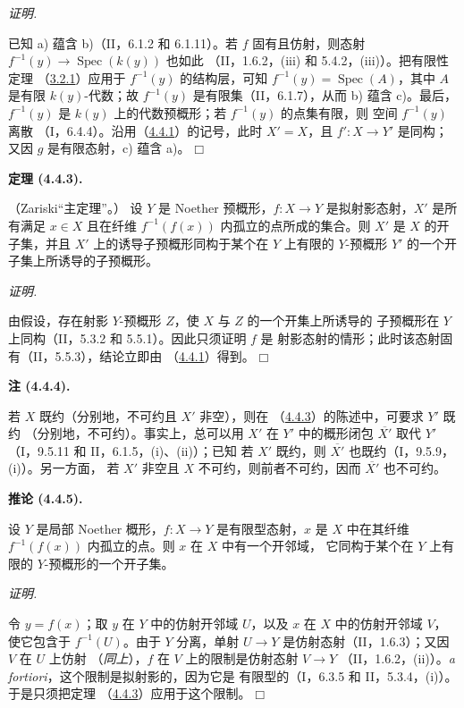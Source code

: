 \documentclass[UTF8,fontset=none,11pt,oneside,openany]{ctexbook}
\providecommand{\square}{\mdlgwhtsquare}
\newenvironment{theorem}[1][]{%
  \par\medskip\noindent\textbf{定理 (#1).}\ %
}{\par}
\newenvironment{corollary}[1][]{%
  \par\medskip\noindent\textbf{推论 (#1).}\ %
}{\par}
\newenvironment{remark}[1][]{%
  \par\medskip\noindent\textbf{注 (#1).}\ %
}{\par}
\newenvironment{proof}{%
  \par\smallskip\noindent\textit{证明.}\ %
}{\hfill$\square$\par}
\let\EGAOriginalLabel\label
\renewcommand{\label}[1]{\phantomsection\EGAOriginalLabel{#1}}
\begin{document}
\begin{proof}
已知 a) 蕴含 b)（II，6.1.2 和 6.1.11）。若 $f$ 固有且仿射，则态射
$f^{-1}(y)\to\operatorname{Spec}(k(y))$ 也如此
（II，1.6.2，(iii) 和 5.4.2，(iii)）。把有限性定理
（\hyperref[III.3.2.1-fr]{3.2.1}）应用于 $f^{-1}(y)$ 的结构层，可知
$f^{-1}(y)=\operatorname{Spec}(A)$，其中 $A$ 是有限 $k(y)$-代数；故
$f^{-1}(y)$ 是有限集（II，6.1.7），从而 b) 蕴含 c)。最后，
$f^{-1}(y)$ 是 $k(y)$ 上的代数预概形；若 $f^{-1}(y)$ 的点集有限，则
空间 $f^{-1}(y)$ 离散
（I，6.4.4）。沿用（\hyperref[III.4.4.1-fr]{4.4.1}）的记号，此时
$X'=X$，且 $f':X\to Y'$ 是同构；又因 $g$ 是有限态射，c) 蕴含 a)。
\end{proof}

\begin{theorem}[4.4.3]
\label{III.4.4.3-fr}
\textnormal{（Zariski“主定理”。）}
设 $Y$ 是 Noether 预概形，$f:X\to Y$ 是拟射影态射，$X'$ 是所有满足
$x\in X$ 且在纤维 $f^{-1}(f(x))$ 内孤立的点所成的集合。则 $X'$ 是
$X$ 的开子集，并且 $X'$ 上的诱导子预概形同构于某个在 $Y$ 上有限的
$Y$-预概形 $Y'$ 的一个开子集上所诱导的子预概形。
\end{theorem}

\begin{proof}
由假设，存在射影 $Y$-预概形 $Z$，使 $X$ 与 $Z$ 的一个开集上所诱导的
子预概形在 $Y$ 上同构（II，5.3.2 和 5.5.1）。因此只须证明 $f$ 是
射影态射的情形；此时该态射固有（II，5.5.3），结论立即由
（\hyperref[III.4.4.1-fr]{4.4.1}）得到。
\end{proof}

\begin{remark}[4.4.4]
\label{III.4.4.4-fr}
若 $X$ 既约（分别地，不可约且 $X'$ 非空），则在
（\hyperref[III.4.4.3-fr]{4.4.3}）的陈述中，可要求 $Y'$ 既约
（分别地，不可约）。事实上，总可以用 $X'$ 在 $Y'$ 中的概形闭包
$\overline{X'}$ 取代 $Y'$（I，9.5.11 和 II，6.1.5，(i)、(ii)）；已知
若 $X'$ 既约，则 $\overline{X'}$ 也既约（I，9.5.9，(i)）。另一方面，
若 $X'$ 非空且 $X$ 不可约，则前者不可约，因而 $\overline{X'}$
也不可约。
\end{remark}

\begin{corollary}[4.4.5]
\label{III.4.4.5-fr}
设 $Y$ 是局部 Noether 概形，$f:X\to Y$ 是有限型态射，$x$ 是 $X$
中在其纤维 $f^{-1}(f(x))$ 内孤立的点。则 $x$ 在 $X$ 中有一个开邻域，
它同构于某个在 $Y$ 上有限的 $Y$-预概形的一个开子集。
\end{corollary}

\begin{proof}
令 $y=f(x)$；取 $y$ 在 $Y$ 中的仿射开邻域 $U$，以及 $x$ 在 $X$
中的仿射开邻域 $V$，使它包含于 $f^{-1}(U)$。由于 $Y$ 分离，单射
$U\to Y$ 是仿射态射（II，1.6.3）；又因 $V$ 在 $U$ 上仿射
（\emph{同上}），$f$ 在 $V$ 上的限制是仿射态射 $V\to Y$
（II，1.6.2，(ii)）。\emph{a fortiori}，这个限制是拟射影的，因为它是
有限型的（I，6.3.5 和 II，5.3.4，(i)）。于是只须把定理
（\hyperref[III.4.4.3-fr]{4.4.3}）应用于这个限制。
\end{proof}
\end{document}
